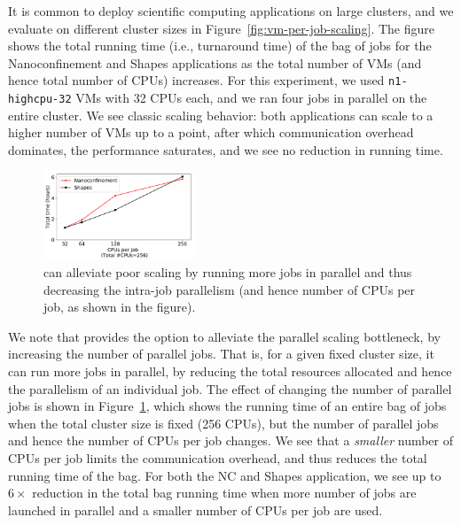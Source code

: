 It is common to deploy scientific computing applications on large clusters, and we evaluate \sysname on different cluster sizes in Figure~\ref{fig:vm-per-job-scaling}.
The figure shows the total running time (i.e., turnaround time) of the bag of jobs for the Nanoconfinement and Shapes applications as the total number of VMs (and hence total number of CPUs) increases.
For this experiment, we used \texttt{n1-highcpu-32} VMs with 32 CPUs each, and we ran four jobs in parallel on the entire cluster. 
We see classic scaling behavior: both applications can scale to a higher number of VMs up to a point, after which communication overhead  dominates, the performance saturates, and we see no reduction in running time. 


\begin{figure}
  \includegraphics[width=0.4\textwidth]{../graphs/par-scaling.pdf}
      \vspace*{\myfigspace}
  \caption{\sysname can alleviate poor scaling by running more jobs in parallel and thus decreasing the intra-job parallelism (and hence number of CPUs per job, as shown in the figure).}
  \label{fig:par-scaling}
    \vspace*{\myfigspace}
\end{figure}


We note that \sysname provides the option to alleviate the parallel scaling bottleneck, by increasing the number of parallel jobs.
That is, for a given fixed cluster size, it can run more jobs in parallel, by reducing the total resources allocated and hence the parallelism 
of an individual job. 
The effect of changing the number of parallel jobs is shown in Figure~\ref{fig:par-scaling}, which shows the running time of an entire bag of jobs when the total cluster size is fixed (256 CPUs), but the number of parallel jobs and hence the number of CPUs per job changes.
We see that a \emph{smaller} number of CPUs per job limits the communication overhead, and thus reduces the total running time of the bag.
For both the NC and Shapes application, we see up to $6\times$ reduction in the total bag running time when more number of jobs are launched in parallel and a smaller number of CPUs per job are used. 


